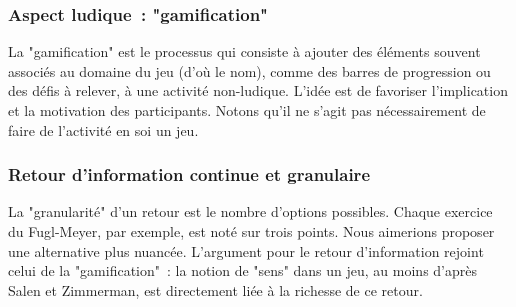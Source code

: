     \subsubsection{Aspect ludique~: "gamification"}
    La "gamification" est le processus qui consiste à ajouter des éléments 
    souvent associés au domaine du jeu (d'où le nom), comme des barres de
    progression ou des défis à relever, à une activité non-ludique. L'idée est 
    de favoriser l'implication et la motivation des participants. 
    Notons qu'il ne s'agit pas nécessairement de faire de l'activité en soi un 
    jeu.
    \subsubsection{Retour d'information continue et granulaire}
    La "granularité" d'un retour est le nombre d'options possibles. 
    Chaque exercice du Fugl-Meyer, par exemple, est noté sur trois points. Nous 
    aimerions proposer une alternative plus nuancée.
    L'argument pour le retour d'information rejoint celui de la "gamification"~:
    la notion de "sens" dans un jeu, au moins d'après Salen et Zimmerman, est 
    directement liée à la richesse de ce retour.
